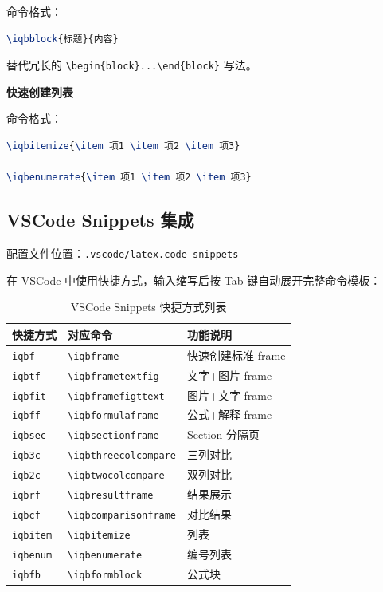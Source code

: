 命令格式：

\begin{lstlisting}[style=blockstyle,language=TeX]
\iqbblock{标题}{内容}
\end{lstlisting}

替代冗长的 \lstinline|\begin{block}...\end{block}| 写法。

\textbf{快速创建列表}

命令格式：

\begin{lstlisting}[style=blockstyle,language=TeX]
\iqbitemize{\item 项1 \item 项2 \item 项3}

\iqbenumerate{\item 项1 \item 项2 \item 项3}
\end{lstlisting}

\subsection{VSCode Snippets 集成}

配置文件位置：\lstinline|.vscode/latex.code-snippets|

在 VSCode 中使用快捷方式，输入缩写后按 Tab 键自动展开完整命令模板：

\begin{table}[!h]
\centering
\caption{VSCode Snippets 快捷方式列表}
\label{tab:vscode-snippets}
\begin{tabular}{p{2cm}p{4.5cm}p{5.5cm}}
\toprule
\textbf{快捷方式} & \textbf{对应命令} & \textbf{功能说明} \\
\midrule
\lstinline|iqbf| & \lstinline|\iqbframe| & 快速创建标准 frame \\
\lstinline|iqbtf| & \lstinline|\iqbframetextfig| & 文字+图片 frame \\
\lstinline|iqbfit| & \lstinline|\iqbframefigttext| & 图片+文字 frame \\
\lstinline|iqbff| & \lstinline|\iqbformulaframe| & 公式+解释 frame \\
\lstinline|iqbsec| & \lstinline|\iqbsectionframe| & Section 分隔页 \\
\lstinline|iqb3c| & \lstinline|\iqbthreecolcompare| & 三列对比 \\
\lstinline|iqb2c| & \lstinline|\iqbtwocolcompare| & 双列对比 \\
\lstinline|iqbrf| & \lstinline|\iqbresultframe| & 结果展示 \\
\lstinline|iqbcf| & \lstinline|\iqbcomparisonframe| & 对比结果 \\
\lstinline|iqbitem| & \lstinline|\iqbitemize| & 列表 \\
\lstinline|iqbenum| & \lstinline|\iqbenumerate| & 编号列表 \\
\lstinline|iqbfb| & \lstinline|\iqbformblock| & 公式块 \\
\bottomrule
\end{tabular}
\end{table}

